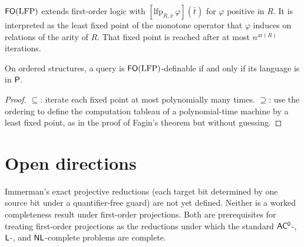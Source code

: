\begin{definition}
  \label{def:desc-lfp}
  $\mathsf{FO}(\mathrm{LFP})$ extends first-order logic with
  $[\mathrm{lfp}_{R,\bar x}\, \varphi](\bar t)$ for $\varphi$ positive in $R$. It
  is interpreted as the least fixed point of the monotone operator that
  $\varphi$ induces on relations of the arity of $R$. That fixed point is reached
  after at most $n^{\mathrm{ar}(R)}$ iterations.
\end{definition}

\begin{theorem}
  \label{thm:desc-immerman-vardi}
  \notready
  On ordered structures, a query is $\mathsf{FO}(\mathrm{LFP})$-definable if and only
  if its language is in $\mathsf{P}$.
\end{theorem}
\begin{proof}
  $\subseteq$: iterate each fixed point at most polynomially many times. $\supseteq$:
  use the ordering to define the computation tableau of a polynomial-time machine
  by a least fixed point, as in the proof of Fagin's theorem but without guessing.
\end{proof}

\section{Open directions}

Immerman's exact projective reductions (each target bit determined by one source
bit under a quantifier-free guard) are not yet defined. Neither is a worked
completeness result under first-order projections. Both are prerequisites for
treating first-order projections as the reductions under which the standard
$\mathsf{AC^0}$-, $\mathsf{L}$-, and $\mathsf{NL}$-complete problems are complete.
